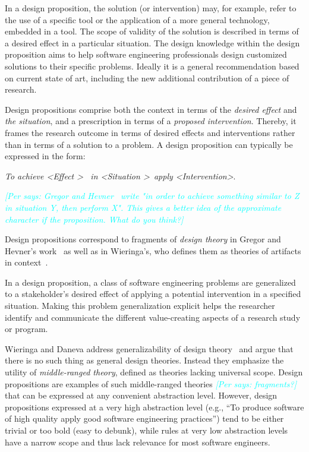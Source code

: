 \documentclass[graybox]{svmult}
\newcommand{\per}[1]{\textcolor{cyan}{{\it [Per says: #1]}}}
\newcommand{\per}[1]{}
\begin{document}
In a design proposition, the solution (or intervention) may, for example,  refer to the use of a specific tool or the application of a more general technology, embedded in a tool. 
The scope of validity of the solution is described in terms of a desired effect in a particular situation.   The design knowledge within the design proposition aims to help software engineering professionals design customized solutions to their specific problems. Ideally it is a general recommendation based on current state of art, including the new additional contribution of a piece of research.

Design propositions comprise both the context in terms of the \emph{desired effect} and \emph{the situation}, and a prescription in terms of a \emph{proposed intervention}. Thereby, it frames the research outcome in terms of desired effects and interventions rather than in terms of a solution to a problem. A design proposition can typically be expressed in the form: 

\begin{center}{\emph{To achieve \textless Effect \textgreater ~ in \textless Situation \textgreater~apply \textless Intervention\textgreater}.} 
\end{center}
\per{ Gregor and Hevner~\cite{gregor_positioning_2013} write "in order to achieve something \emph{similar to} Z in situation Y, then perform X". This gives a better idea of the approximate character if the proposition. What do you think?}

Design propositions correspond to fragments of \emph{design theory} in Gregor and Hevner's work~\cite{gregor_positioning_2013} as well as in Wieringa's, who defines them as theories of artifacts in context~\cite{wieringa_design_2009}.


In a design proposition, a class of software engineering problems are generalized to a stakeholder's desired effect of applying a potential intervention in a specified situation. 
Making this problem generalization explicit helps the researcher identify and communicate the different value-creating aspects of a research study or program.


Wieringa and Daneva address generalizability of design theory~\cite{wieringa_six_2015} and argue that there is no such thing as general design theories. Instead they emphasize the utility of \emph{middle-ranged theory}, defined as theories lacking universal scope. 
Design propositions are examples of such middle-ranged theories \per{fragments?} that can be expressed at any convenient abstraction level. However, design propositions expressed at a very high abstraction level (e.g., ``To produce software of high quality apply good software engineering practices'') tend to be either trivial or too bold (easy to debunk), while rules at very low abstraction levels have a narrow scope and thus lack relevance for most software engineers. 
\end{document}
